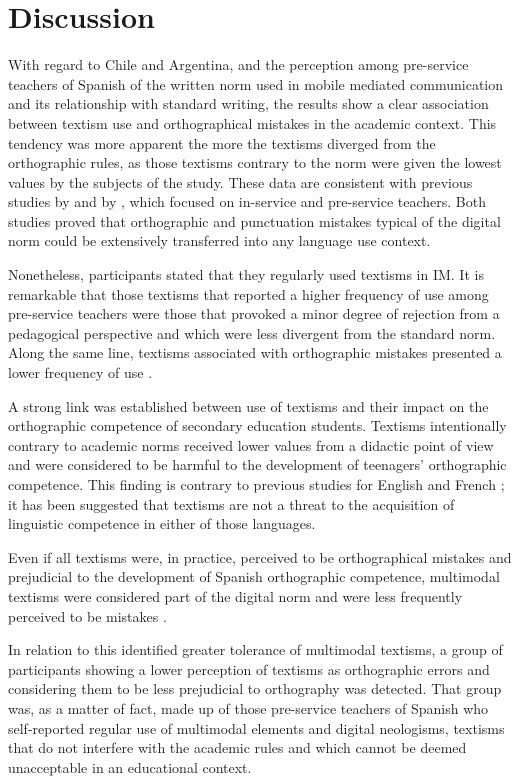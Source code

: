 \documentclass[english]{textolivre}
\begin{document}
\section{Discussion}
With regard to Chile and Argentina, and the perception among pre-service teachers of Spanish of the written norm used in mobile mediated communication and its relationship with standard writing, the results show a clear association between textism use and orthographical mistakes in the academic context. This tendency was more apparent the more the textisms diverged from the orthographic rules, as those textisms contrary to the norm were given the lowest values by the subjects of the study. These data are consistent with previous studies by \textcite{Gomez-Camacho2018} and by \textcite{Cremades2019b}, which focused on in-service and pre-service teachers. Both studies proved that orthographic and punctuation mistakes typical of the digital norm could be extensively transferred into any language use context. 

Nonetheless, participants stated that they regularly used textisms in IM. It is remarkable that those textisms that reported a higher frequency of use among pre-service teachers were those that provoked a minor degree of rejection from a pedagogical perspective and which were less divergent from the standard norm. Along the same line, textisms associated with orthographic mistakes presented a lower frequency of use \cite{Gomez-Camacho2016, Gomez-Camacho2018}.

A strong link was established between use of textisms and their impact on the orthographic competence of secondary education students. Textisms intentionally contrary to academic norms received lower values from a didactic point of view and were considered to be harmful to the development of teenagers’ orthographic competence. This finding is contrary to previous studies for English \cite{Kemp2011} and French \cite{Bernicot2014, Cougnon2017}; it has been suggested that textisms are not a threat to the acquisition of linguistic competence in either of those languages.

Even if all textisms were, in practice, perceived to be orthographical mistakes and prejudicial to the development of Spanish orthographic competence, multimodal textisms were considered part of the digital norm and were less frequently perceived to be mistakes \cite{Gomez-Camacho2018}. 

In relation to this identified greater tolerance of multimodal textisms, a group of participants showing a lower perception of textisms as orthographic errors and considering them to be less prejudicial to orthography was detected. That group was, as a matter of fact, made up of those pre-service teachers of Spanish who self-reported regular use of multimodal elements and digital neologisms, textisms that do not interfere with the academic rules and which cannot be deemed unacceptable in an educational context. 
\end{document}
